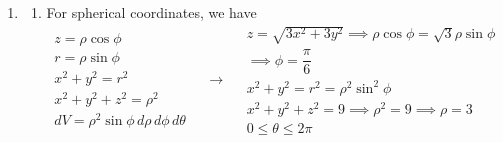 \documentclass[a4paper, 12pt]{article}
\begin{document}
\begin{enumerate}[leftmargin=*,label=\textbf{\arabic*.}]
Multiply each side by $2$ to obviate the mess with the fraction $\displaystyle\frac12$ and then change the order of integration. Let $I_2=2I_1$.
\begin{align*}
I_2&=\int_{-1}^{\textstyle-\frac13}\int_1^{\textstyle-\frac1u}u\sin(uv)\,dv\,du+\int_{\textstyle-\frac13}^{\textstyle\frac13}\int_1^3u\sin(uv)\,dv\,du+\int_{\textstyle\frac13}^1\int_1^{\textstyle\frac1u}u\sin(uv)\,dv\,du\\[1em]&=\int_{-1}^{\textstyle-\frac13}(-\cos(uv))\bigg|_{v=1}^{v=-\frac1u}du+\int_{\textstyle-\frac13}^{\textstyle\frac13}(-\cos(uv))\bigg|_{v=1}^{v=3}du+\int_{\textstyle\frac13}^1(-\cos(uv))\bigg|_{v=1}^{v=\frac1u}du\\[1em]&=\int_{-1}^{\textstyle-\frac13}[-\cos(-1)+\cos u]\,du+\int_{\textstyle-\frac13}^{\textstyle\frac13}[-\cos(3u)+\cos u]\,du+\int_{\textstyle\frac13}^1[-\cos1+\cos u]\,du\\[1em]&=\bigg[-u\cos(-1)+\sin u\bigg]_{-1}^{\textstyle-\frac13}+\bigg[-\frac13\sin(3u)+\sin u\bigg]_{\textstyle-\frac13}^{\textstyle\frac13}+\bigg[-u\cos1+\sin u\bigg]_{\textstyle\frac13}^1
\end{align*}

\begin{align*}
I_2&=\left[-\frac23\cos(-1)+\sin\left(-\frac13\right)-\sin(-1)\right]\\[1em]&\quad\:+\left[-\frac13\left(\sin1-\sin(-1)\right)+\sin\frac13-\sin\left(-\frac13\right)\right]\\[1em]&\quad\:+\left[-\frac23\cos1+\sin1-\sin\frac13\right]\\[1em]&=\frac43(\sin1-\cos1)
\end{align*}

Therefore, $\boxed{{I_1}=\frac23(\sin1-\cos1)}$.

\item \begin{enumerate}[leftmargin=*,label=\textbf{\alph*.}]
\item
For spherical coordinates, we have
\[
\begin{array}{c}
z=\rho\cos\phi\\
r=\rho\sin\phi\\
x^2+y^2=r^2\\
x^2+y^2+z^2=\rho^2\\
dV=\rho^2\sin\phi\,d\rho\,d\phi\,d\theta
\end{array}\quad\rightarrow\quad
\begin{array}{c}
\displaystyle z=\sqrt{3x^2+3y^2}\implies\rho\cos\phi=\sqrt3\rho\sin\phi\\[0.2cm]\implies\phi=\dfrac\pi6\\[0.2cm]
x^2+y^2=r^2=\rho^2\sin^2\phi\\[0.1cm]
x^2+y^2+z^2=9\implies\rho^2=9\implies\rho=3\\[0.1cm]
0\leq\theta\leq2\pi
\end{array}
\]


\end{enumerate}
\end{enumerate}
\end{document}
